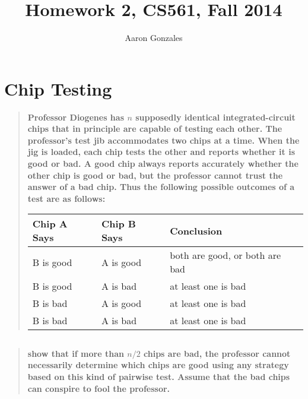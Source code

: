 \documentclass[titlepage]{article}\usepackage[]{graphicx}\usepackage[]{color}
\begin{document}
\title{Homework 2, CS561, Fall 2014}
\author{Aaron Gonzales}
\maketitle


\section{Chip Testing }

\begin{quote}
\textbf{Professor Diogenes has $n$ supposedly identical integrated-circuit chips that
in principle are capable of testing each other. The professor's test jib
accommodates two chips at a time. When the jig is loaded, each chip tests the
other and reports whether it is good or bad. A good chip always reports
accurately whether the other chip is good or bad, but the professor cannot
trust the answer of a bad chip. Thus the following possible outcomes of a test
are as follows:}

\begin{table}[h]
  \begin{tabular}{lll}
	\hline
	\multicolumn{1}{|l|}{Chip A Says} & \multicolumn{1}{l|}{Chip B Says} & \multicolumn{1}{l|}{Conclusion} \\ \hline
	B is good                         & A is good                        & both are good, or both are bad  \\ \hline
	B is good                         & A is bad                         & at least one is bad             \\ \hline
	B is bad                          & A is good                        & at least one is bad             \\ \hline
	B is bad                          & A is bad                         & at least one is bad             \\ \hline
	\end{tabular}
  \end{table}

\end{quote}


\subsection{}
  \begin{quote}
\textbf{show that if more than $n/2$ chips are bad, the professor cannot
	necessarily determine which chips are good using any strategy based on this
	kind of pairwise test. Assume that the bad chips can conspire to fool the
	professor. }
  \end{quote}
\end{document}
